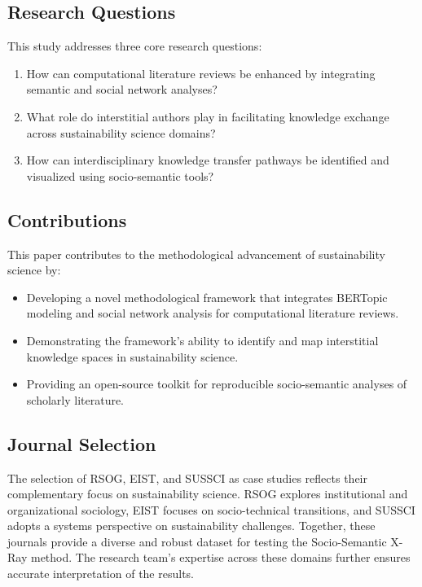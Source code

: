 \documentclass[12pt]{article}
\begin{document}
\subsection{Research Questions}
This study addresses three core research questions:
\begin{enumerate}
    \item How can computational literature reviews be enhanced by integrating semantic and social network analyses?
    \item What role do interstitial authors play in facilitating knowledge exchange across sustainability science domains?
    \item How can interdisciplinary knowledge transfer pathways be identified and visualized using socio-semantic tools?
\end{enumerate}

\subsection{Contributions}
This paper contributes to the methodological advancement of sustainability science by:
\begin{itemize}
    \item Developing a novel methodological framework that integrates BERTopic modeling and social network analysis for computational literature reviews.
    \item Demonstrating the framework’s ability to identify and map interstitial knowledge spaces in sustainability science.
    \item Providing an open-source toolkit for reproducible socio-semantic analyses of scholarly literature.
\end{itemize}

\subsection{Journal Selection}
The selection of RSOG, EIST, and SUSSCI as case studies reflects their complementary focus on sustainability science. RSOG explores institutional and organizational sociology, EIST focuses on socio-technical transitions, and SUSSCI adopts a systems perspective on sustainability challenges. Together, these journals provide a diverse and robust dataset for testing the Socio-Semantic X-Ray method. The research team’s expertise across these domains further ensures accurate interpretation of the results.
\end{document}
